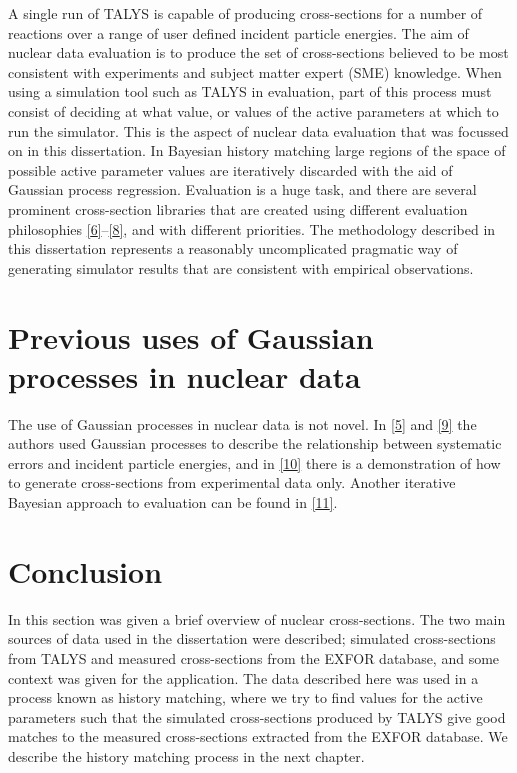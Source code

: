 \documentclass[
  12pt,
  a4paper,
  twoside]{book}
\begin{document}
A single run of TALYS is capable of producing cross-sections for a number of reactions over a range of user defined incident particle energies. The aim of nuclear data evaluation is to produce the set of cross-sections believed to be most consistent with experiments and subject matter expert (SME) knowledge. When using a simulation tool such as TALYS in evaluation, part of this process must consist of deciding at what value, or values of the active parameters at which to run the simulator. This is the aspect of nuclear data evaluation that was focussed on in this dissertation. In Bayesian history matching large regions of the space of possible active parameter values are iteratively discarded with the aid of Gaussian process regression. Evaluation is a huge task, and there are several prominent cross-section libraries that are created using different evaluation philosophies \protect\hyperlink{ref-endf}{{[}6{]}}--\protect\hyperlink{ref-tendl}{{[}8{]}}, and with different priorities. The methodology described in this dissertation represents a reasonably uncomplicated pragmatic way of generating simulator results that are consistent with empirical observations.

\hypertarget{Background:previousgps}{%
\section{Previous uses of Gaussian processes in nuclear data}\label{Background:previousgps}}

The use of Gaussian processes in nuclear data is not novel. In \protect\hyperlink{ref-Schnabel_2021}{{[}5{]}} and \protect\hyperlink{ref-HELGESSON_2018}{{[}9{]}} the authors used Gaussian processes to describe the relationship between systematic errors and incident particle energies, and in \protect\hyperlink{ref-gp_interpolator}{{[}10{]}} there is a demonstration of how to generate cross-sections from experimental data only. Another iterative Bayesian approach to evaluation can be found in \protect\hyperlink{ref-Bayesian_ML}{{[}11{]}}.

\hypertarget{conclusion}{%
\section{Conclusion}\label{conclusion}}

In this section was given a brief overview of nuclear cross-sections. The two main sources of data used in the dissertation were described; simulated cross-sections from TALYS and measured cross-sections from the EXFOR database, and some context was given for the application. The data described here was used in a process known as history matching, where we try to find values for the active parameters such that the simulated cross-sections produced by TALYS give good matches to the measured cross-sections extracted from the EXFOR database. We describe the history matching process in the next chapter.
\end{document}
